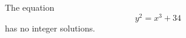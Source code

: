 \begin{proposition}
    The equation
\[
    y^2=x^3+34
\]
    has no integer solutions.
\end{proposition}
